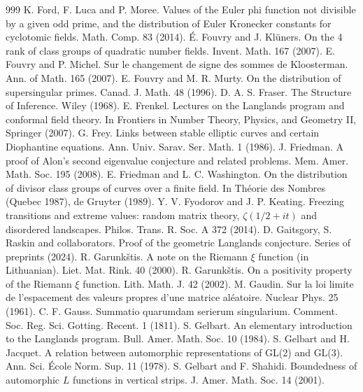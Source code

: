 \begin{thebibliography}{999}
 K. Ford, F. Luca and P. Moree. Values of the Euler phi function not divisible by a given odd prime, and the distribution of Euler Kronecker constants for cyclotomic fields. Math. Comp. 83 (2014).
 \'E. Fouvry and J. Kl\"uners. On the 4 rank of class groups of quadratic number fields. Invent. Math. 167 (2007).
 E. Fouvry and P. Michel. Sur le changement de signe des sommes de Kloosterman. Ann. of Math. 165 (2007).
 E. Fouvry and M. R. Murty. On the distribution of supersingular primes. Canad. J. Math. 48 (1996).
 D. A. S. Fraser. The Structure of Inference. Wiley (1968).
 E. Frenkel. Lectures on the Langlands program and conformal field theory. In Frontiers in Number Theory, Physics, and Geometry II, Springer (2007).
 G. Frey. Links between stable elliptic curves and certain Diophantine equations. Ann. Univ. Sarav. Ser. Math. 1 (1986).
 J. Friedman. A proof of Alon's second eigenvalue conjecture and related problems. Mem. Amer. Math. Soc. 195 (2008).
 E. Friedman and L. C. Washington. On the distribution of divisor class groups of curves over a finite field. In Th\'eorie des Nombres (Quebec 1987), de Gruyter (1989).
 Y. V. Fyodorov and J. P. Keating. Freezing transitions and extreme values: random matrix theory, $\zeta(1/2+it)$ and disordered landscapes. Philos. Trans. R. Soc. A 372 (2014).
 D. Gaitsgory, S. Raskin and collaborators. Proof of the geometric Langlands conjecture. Series of preprints (2024).
 R. Garunk\v{s}tis. A note on the Riemann $\xi$ function (in Lithuanian). Liet. Mat. Rink. 40 (2000).
 R. Garunk\v{s}tis. On a positivity property of the Riemann $\xi$ function. Lith. Math. J. 42 (2002).
 M. Gaudin. Sur la loi limite de l'espacement des valeurs propres d'une matrice al\'eatoire. Nuclear Phys. 25 (1961).
 C. F. Gauss. Summatio quarumdam serierum singularium. Comment. Soc. Reg. Sci. Gotting. Recent. 1 (1811).
 S. Gelbart. An elementary introduction to the Langlands program. Bull. Amer. Math. Soc. 10 (1984).
 S. Gelbart and H. Jacquet. A relation between automorphic representations of GL(2) and GL(3). Ann. Sci. \'Ecole Norm. Sup. 11 (1978).
 S. Gelbart and F. Shahidi. Boundedness of automorphic $L$ functions in vertical strips. J. Amer. Math. Soc. 14 (2001).

\end{thebibliography}
